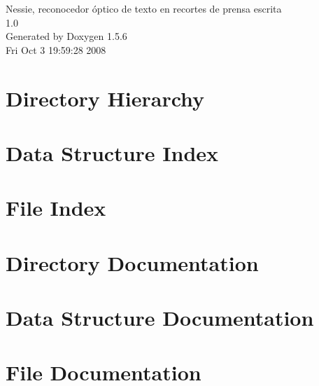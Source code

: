 \documentclass[a4paper]{book}
\begin{document}
\begin{titlepage}
\vspace*{7cm}
\begin{center}
{\Large Nessie, reconocedor óptico de texto en recortes de prensa escrita \\[1ex]\large 1.0 }\\
\vspace*{1cm}
{\large Generated by Doxygen 1.5.6}\\
\vspace*{0.5cm}
{\small Fri Oct 3 19:59:28 2008}\\
\end{center}
\end{titlepage}
\clearemptydoublepage
{}
\tableofcontents
\clearemptydoublepage
{}
\chapter{Directory Hierarchy}

\chapter{Data Structure Index}

\chapter{File Index}

\chapter{Directory Documentation}


\chapter{Data Structure Documentation}







\chapter{File Documentation}
















\printindex
\end{document}
